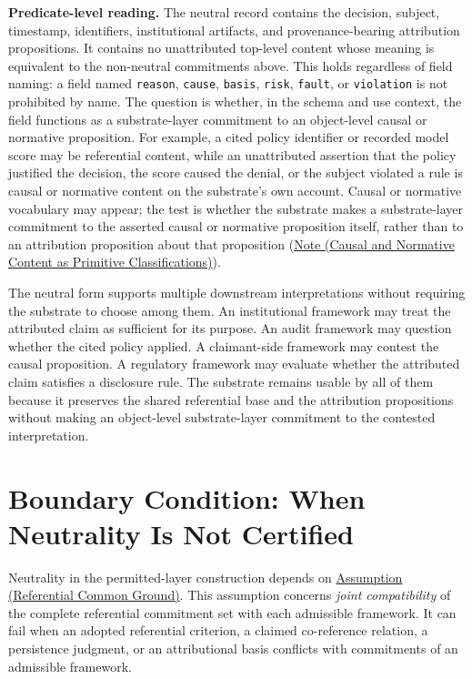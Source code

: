 \documentclass[11pt]{article}
\theoremstyle{plain}
\theoremstyle{definition}
\theoremstyle{remark}
\newcommand{\AssumpRef}[2]{\hyperref[#1]{Assumption (#2)}}
\newcommand{\NoteRef}[2]{\hyperref[#1]{Note (#2)}}
\begin{document}
\textbf{Predicate-level reading.}
The neutral record contains the
decision, subject, timestamp, identifiers, institutional artifacts, and
provenance-bearing attribution propositions.
It contains no unattributed top-level content whose meaning is equivalent to
the non-neutral commitments above.
This holds regardless of field naming:
a field named \texttt{reason}, \texttt{cause},
\texttt{basis}, \texttt{risk}, \texttt{fault}, or \texttt{violation}
is not prohibited by name.
The question is whether, in the schema and use context,
the field functions as a substrate-layer commitment to an object-level causal or normative proposition.
For example, a cited policy identifier or recorded model score may be referential content,
while an unattributed assertion that the policy justified the decision,
the score caused the denial, or the subject violated a rule is
causal or normative content on the substrate's own account.
Causal or normative vocabulary may appear;
the test is whether the substrate makes a substrate-layer commitment
to the asserted causal or normative proposition itself,
rather than to an attribution proposition about that proposition
(\NoteRef{se100.note.CausalNormative}{Causal and Normative Content as Primitive
  Classifications}).

The neutral form supports multiple downstream interpretations without
requiring the substrate to choose among them.
An institutional framework may treat the attributed claim as sufficient
for its purpose.
An audit framework may question whether the cited policy applied.
A claimant-side framework may contest the causal proposition.
A regulatory framework may evaluate whether the attributed claim satisfies
a disclosure rule.
The substrate remains usable by all of them
because it preserves the shared referential base and the attribution
propositions without making an object-level substrate-layer commitment
to the contested interpretation.

\section{Boundary Condition: When Neutrality Is Not Certified}
\label{sec:boundary}

Neutrality in the permitted-layer construction depends on
\AssumpRef{se100.assump.ReferentialCommonGround}{Referential Common Ground}.
This assumption concerns \emph{joint compatibility} of the complete
referential commitment set with each admissible framework.
It can fail when an adopted referential criterion, a claimed co-reference
relation, a persistence judgment, or an attributional basis conflicts
with commitments of an admissible framework.
\end{document}
